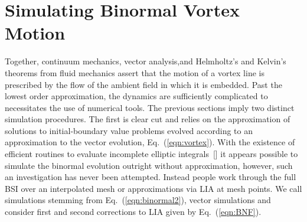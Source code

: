 \documentclass[aps,graphicx,reprint,onecolumn,12pt,tightenlines,longbibliography]{revtex4-1}
\newcommand{\sas}[2]{{#2}}
\begin{document}
\section{\label{sec:simulations} Simulating Binormal Vortex Motion}

Together, continuum mechanics, vector analysis,\sas{}{and} Helmholtz's and Kelvin's theorems from fluid mechanics assert that the motion of a vortex line is prescribed by the flow of the ambient field in which it is embedded. Past the lowest order approximation, the dynamics are sufficiently complicated \sas{and}{to} necessitate\sas{}{s} the use of numerical tools. The previous sections imply two distinct simulation procedures. The first is clear cut and relies on the approximation of solutions to initial-boundary value problems evolved according to an approximation to the vector evolution, Eq.~(\ref{eqn:vortex}). With the existence of efficient routines to evaluate incomplete elliptic integrals~[] it appears possible to simulate the binormal evolution outright without approximation, however, such an investigation has never been attempted. Instead people work through the full BSI over an interpolated mesh or approximations via LIA at mesh points.  We call simulations stemming from Eq.~(\ref{eqn:binormal2}), {vector \sas{evolutions/}{}simulations} and consider first and second corrections to LIA given by Eq.~(\ref{eqn:BNF})\sas{}{.} 
\end{document}
